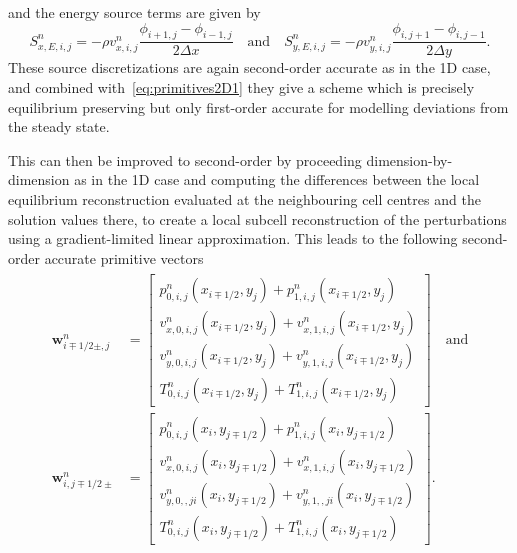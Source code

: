 and the energy source terms are given by
\begin{equation}
S_{x,E,i,j}^n=-\rho v_{x,i,j}^n\frac{\phi_{i+1,j}-\phi_{i-1,j}}{2\Delta x} \quad \textrm{and} \quad S_{y,E,i,j}^n=-\rho v_{y,i,j}^n\frac{\phi_{i,j+1}-\phi_{i,j-1}}{2\Delta y}.
\end{equation}
These source discretizations are again second-order accurate as in the 1D case, and combined with~\eqref{eq:primitives2D1} they give a scheme which is precisely equilibrium preserving but only first-order accurate for modelling deviations from the steady state.

This can then be improved to second-order by proceeding dimension-by-dimension as in the 1D case and computing the differences between the local equilibrium reconstruction evaluated at the neighbouring cell centres and the solution values there, to create a local subcell reconstruction of the perturbations using a gradient-limited linear approximation. This leads to the following second-order accurate primitive vectors
\begin{align} \label{eq:primitives2D2}
\begin{split}
\mathbf{w}_{i\mp1/2\pm,j}^n&=
\begin{bmatrix}
p_{0,i,j}^n(x_{i\mp1/2},y_j)+p_{1,i,j}^n(x_{i\mp1/2},y_j) \\ v_{x,0,i,j}^n(x_{i\mp1/2},y_j)+v_{x,1,i,j}^n(x_{i\mp1/2},y_j) \\ v_{y,0,i,j}^n(x_{i\mp1/2},y_j)+v_{y,1,i,j}^n(x_{i\mp1/2},y_j) \\ T_{0,i,j}^n(x_{i\mp1/2},y_j)+T_{1,i,j}^n(x_{i\mp1/2},y_j)
\end{bmatrix} \quad \textrm{and} \\
\mathbf{w}_{i,j\mp1/2\pm}^n&=
\begin{bmatrix}
p_{0,i,j}^n(x_i,y_{j\mp1/2})+p_{1,i,j}^n(x_i,y_{j\mp1/2}) \\ v_{x,0,i,j}^n(x_i,y_{j\mp1/2})+v_{x,1,i,j}^n(x_i,y_{j\mp1/2}) \\ v_{y,0,,ji}^n(x_i,y_{j\mp1/2})+v_{y,1,,ji}^n(x_i,y_{j\mp1/2}) \\ T_{0,i,j}^n(x_i,y_{j\mp1/2})+T_{1,i,j}^n(x_i,y_{j\mp1/2})
\end{bmatrix}.
\end{split}
\end{align}
